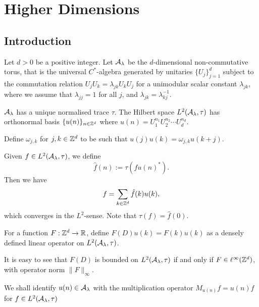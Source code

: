 
\chapter{Higher Dimensions} %

\label{Chapter7} %


\section{Introduction}

Let $d > 0$ be a positive integer. 
Let $\mathcal{A}_{\lambda}$ be the $d$-dimensional non-commutative torus, that is the universal $C^*$-algebra
generated by unitaries $\{U_j\}_{j=1}^d$ subject to the commutation
relation $U_j U_k = \lambda_{jk} U_k U_j$ for a unimodular
scalar constant $\lambda_{jk}$, where we assume that $\lambda_{jj} = 1$
for all $j$, and $\lambda_{jk} = \lambda_{kj}^{-1}$.

$\mathcal{A}_\lambda$ has a unique normalised trace $\tau$.
The Hilbert space $L^2(\mathcal{A}_\lambda,\tau)$ 
has orthonormal basis $\{u(n)\}_{n \in \mathbb{Z}^d}$ where $u(n) = U_1^{n_1}U_2^{n_2}\cdots U_d^{n_d}$.

Define $\omega_{j,k}$ for $j,k \in \mathbb{Z}^d$ to be such
that $u(j)u(k) = \omega_{j,k}u(k+j)$.

Given $f \in L^2(\mathcal{A}_\lambda,\tau)$, we define
\begin{equation}
    \hat{f}(n) := \tau(fu(n)^*).
\end{equation}
Then we have
\begin{equation}
    f = \sum_{k \in \mathbb{Z}^d} \hat{f}(k)u(k),
\end{equation}
which converges in the $L^2$-sense. Note that $\tau(f) = \hat{f}(0)$.

For a function $F:\mathbb{Z}^d\rightarrow \mathbb{R}$, define $F(D) u(k) = F(k)u(k)$
as a densely defined linear operator on $L^2(\mathcal{A}_\lambda,\tau)$. 

It is easy to see that $F(D)$ is bounded on $L^2(\mathcal{A}_\lambda,\tau)$
if and only if $F \in \ell^\infty(\mathbb{Z}^d)$, with operator norm
$\|F\|_\infty$.

We shall identify $u(n) \in \mathcal{A}_\lambda$ with the multiplication operator
$M_{u(n)}f = u(n)f$ for $f \in L^2(\mathcal{A}_\lambda,\tau)$

